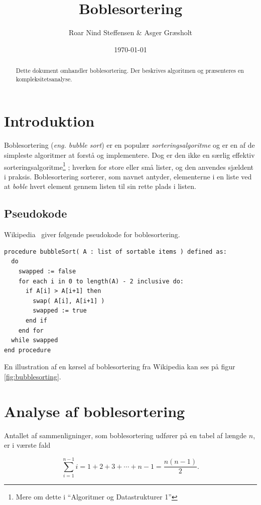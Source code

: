 \documentclass[a4paper]{article}
\title{Boblesortering}
\author{Roar Nind Steffensen \& Asger Græsholt}
\date{\today}
\begin{document}
\maketitle

\begin{abstract}
    Dette dokument omhandler boblesortering. Der beskrives algoritmen og præsenteres en kompleksitetsanalyse.
\end{abstract}


\section{Introduktion}

Boblesortering (\textit{eng. bubble sort}) er en populær \textit{sorteringsalgoritme} og er en af de simpleste algoritmer at forstå og implementere. Dog er den ikke en særlig effektiv sorteringsalgoritme\footnote{Mere om dette i “Algoritmer og Datastrukturer 1”} ; hverken for store eller små lister, og den anvendes sjældent i praksis. Boblesortering sorterer, som navnet antyder, elementerne i en liste ved at \textit{boble} hvert element gennem listen til sin rette plads i listen.

\subsection{Pseudokode}

Wikipedia~\cite{wiki} giver følgende pseudokode for boblesortering.

\begin{verbatim}
procedure bubbleSort( A : list of sortable items ) defined as:
  do
    swapped := false
    for each i in 0 to length(A) - 2 inclusive do:
      if A[i] > A[i+1] then
        swap( A[i], A[i+1] )
        swapped := true
      end if
    end for
  while swapped
end procedure
\end{verbatim}
En illustration af en kørsel af boblesortering fra Wikipedia kan ses på figur \ref{fig:bubblesorting}.

\section{Analyse af boblesortering}
Antallet af sammenligninger, som boblesortering udfører på en tabel af længde $n$, er i værste fald

\begin{equation*}
    \sum_{i=1}^{n-1} i = 1 + 2 + 3 + \dotsb + n - 1 = \frac{n(n-1)}{2}.
\end{equation*}
\end{document}
